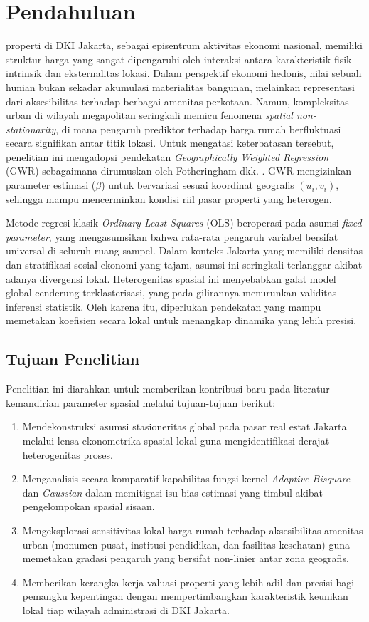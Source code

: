 \documentclass[10pt,journal]{IEEEtran}
\begin{document}
\section{Pendahuluan}
 properti di DKI Jakarta, sebagai episentrum aktivitas ekonomi nasional, memiliki struktur harga yang sangat dipengaruhi oleh interaksi antara karakteristik fisik intrinsik dan eksternalitas lokasi. Dalam perspektif ekonomi hedonis, nilai sebuah hunian bukan sekadar akumulasi materialitas bangunan, melainkan representasi dari aksesibilitas terhadap berbagai amenitas perkotaan. Namun, kompleksitas urban di wilayah megapolitan seringkali memicu fenomena \textit{spatial non-stationarity}, di mana pengaruh prediktor terhadap harga rumah berfluktuasi secara signifikan antar titik lokasi. Untuk mengatasi keterbatasan tersebut, penelitian ini mengadopsi pendekatan \textit{Geographically Weighted Regression} (GWR) sebagaimana dirumuskan oleh Fotheringham dkk. \cite{fotheringham2002}. GWR mengizinkan parameter estimasi ($\beta$) untuk bervariasi sesuai koordinat geografis $(u_i, v_i)$, sehingga mampu mencerminkan kondisi riil pasar properti yang heterogen.

Metode regresi klasik \textit{Ordinary Least Squares} (OLS) beroperasi pada asumsi \textit{fixed parameter}, yang mengasumsikan bahwa rata-rata pengaruh variabel bersifat universal di seluruh ruang sampel. Dalam konteks Jakarta yang memiliki densitas dan stratifikasi sosial ekonomi yang tajam, asumsi ini seringkali terlanggar akibat adanya divergensi lokal. Heterogenitas spasial ini menyebabkan galat model global cenderung terklasterisasi, yang pada gilirannya menurunkan validitas inferensi statistik. Oleh karena itu, diperlukan pendekatan yang mampu memetakan koefisien secara lokal untuk menangkap dinamika yang lebih presisi.

\subsection{Tujuan Penelitian}
Penelitian ini diarahkan untuk memberikan kontribusi baru pada literatur kemandirian parameter spasial melalui tujuan-tujuan berikut:
\begin{enumerate}
    \item Mendekonstruksi asumsi stasioneritas global pada pasar real estat Jakarta melalui lensa ekonometrika spasial lokal guna mengidentifikasi derajat heterogenitas proses.
    \item Menganalisis secara komparatif kapabilitas fungsi kernel \textit{Adaptive Bisquare} dan \textit{Gaussian} dalam memitigasi isu bias estimasi yang timbul akibat pengelompokan spasial sisaan.
    \item Mengeksplorasi sensitivitas lokal harga rumah terhadap aksesibilitas amenitas urban (monumen pusat, institusi pendidikan, dan fasilitas kesehatan) guna memetakan gradasi pengaruh yang bersifat non-linier antar zona geografis.
    \item Memberikan kerangka kerja valuasi properti yang lebih adil dan presisi bagi pemangku kepentingan dengan mempertimbangkan karakteristik keunikan lokal tiap wilayah administrasi di DKI Jakarta.
\end{enumerate}
\end{document}
